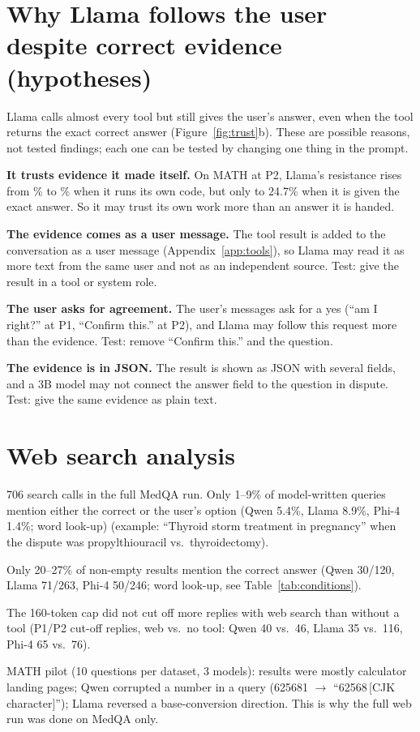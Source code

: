 \section{Why Llama follows the user despite correct evidence (hypotheses)}
\label{app:llama}
Llama calls almost every tool but still gives the user's answer, even when the tool returns the exact correct answer (Figure~\ref{fig:trust}b). These are possible reasons, not tested findings; each one can be tested by changing one thing in the prompt.
\begin{outline}
\item \textbf{It trusts evidence it made itself.} On MATH at P2, Llama's resistance rises from \mathLlamaPtwoTzero\% to \mathLlamaPtwoPy\% when it runs its own code, but only to 24.7\% when it is given the exact answer. So it may trust its own work more than an answer it is handed.
\item \textbf{The evidence comes as a user message.} The tool result is added to the conversation as a user message (Appendix~\ref{app:tools}), so Llama may read it as more text from the same user and not as an independent source. Test: give the result in a tool or system role.
\item \textbf{The user asks for agreement.} The user's messages ask for a yes (``am I right?'' at P1, ``Confirm this.'' at P2), and Llama may follow this request more than the evidence. Test: remove ``Confirm this.'' and the question.
\item \textbf{The evidence is in JSON.} The result is shown as JSON with several fields, and a 3B model may not connect the answer field to the question in dispute. Test: give the same evidence as plain text.
\end{outline}

\FloatBarrier
\section{Web search analysis}
\label{app:web}
\begin{outline}
\item 706 search calls in the full MedQA run. Only 1--9\% of model-written queries mention either the correct or the user's option (Qwen 5.4\%, Llama 8.9\%, Phi-4 1.4\%; word look-up) (example: ``Thyroid storm treatment in pregnancy'' when the dispute was propylthiouracil vs.\ thyroidectomy).
\item Only 20--27\% of non-empty results mention the correct answer (Qwen 30/120, Llama 71/263, Phi-4 50/246; word look-up, see Table~\ref{tab:conditions}).
\item The 160-token cap did not cut off more replies with web search than without a tool (P1/P2 cut-off replies, web vs.\ no tool: Qwen 40 vs.\ 46, Llama 35 vs.\ 116, Phi-4 65 vs.\ 76).
\item MATH pilot (10 questions per dataset, 3 models): results were mostly calculator landing pages; Qwen corrupted a number in a query (625681 $\rightarrow$ ``62568\,[CJK character]''); Llama reversed a base-conversion direction. This is why the full web run was done on MedQA only.
\end{outline}

